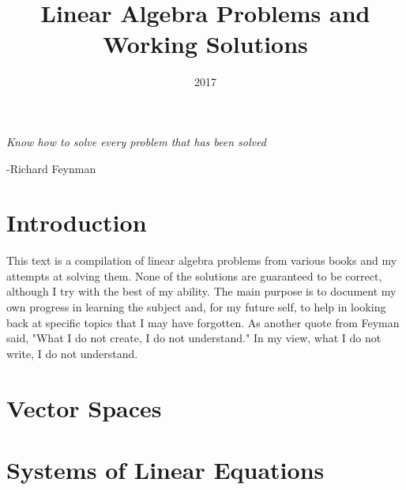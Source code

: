 \documentclass{report}
\title{Linear Algebra Problems and Working Solutions}
\date{2017}
\begin{document}
	\maketitle
	\begin{center}
		\textit{Know how to solve every problem that has been solved} 
		
		-Richard Feynman
	\end{center}
	\tableofcontents
	\chapter{Introduction}
	This text is a compilation of linear algebra problems from various books and my attempts at solving them.  None of the solutions are guaranteed to be correct, although I try with the best of my ability.  The main purpose is to document my own progress in learning the subject and, for my future self, to help in looking back at specific topics that I may have forgotten.  As another quote from Feyman said, "What I do not create, I do not understand."  In my view, what I do not write, I do not understand.
	\chapter{Vector Spaces}
	
	\chapter{Systems of Linear Equations}
	
	
\end{document}
